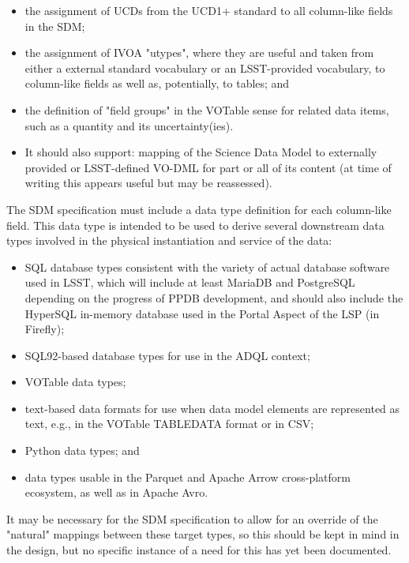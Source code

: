 \begin{itemize}
\item      the assignment of UCDs from the UCD1+ standard to all column-like fields in the SDM;
    \item the assignment of IVOA "utypes", where they are useful and taken from either a external standard vocabulary or an LSST-provided vocabulary, to column-like fields as well as, potentially, to tables; and
    \item the definition of "field groups" in the VOTable sense for related data items, such as a quantity and its uncertainty(ies).
\item It should also support:
    mapping of the Science Data Model to externally provided or LSST-defined VO-DML for part or all of its content (at time of writing this appears useful but may be reassessed).
\end{itemize}

The SDM specification must include a data type definition for each column-like field.  This data type is intended to be used to derive several downstream data types involved in the physical instantiation and service of the data:

\begin{itemize}
\item     SQL database types consistent with the variety of actual database software used in LSST, which will include at least MariaDB and PostgreSQL depending on the progress of PPDB development, and should also include the HyperSQL in-memory database used in the Portal Aspect of the LSP (in Firefly);
    \item SQL92-based database types for use in the ADQL context;
    \item VOTable data types;
    \item text-based data formats for use when data model elements are represented as text, e.g., in the VOTable TABLEDATA format or in CSV;
    \item Python data types; and
    \item data types usable in the Parquet and Apache Arrow cross-platform ecosystem, as well as in Apache Avro.
\end{itemize}

It may be necessary for the SDM specification to allow for an override of the "natural" mappings between these target types, so this should be kept in mind in the design, but no specific instance of a need for this has yet been documented.


